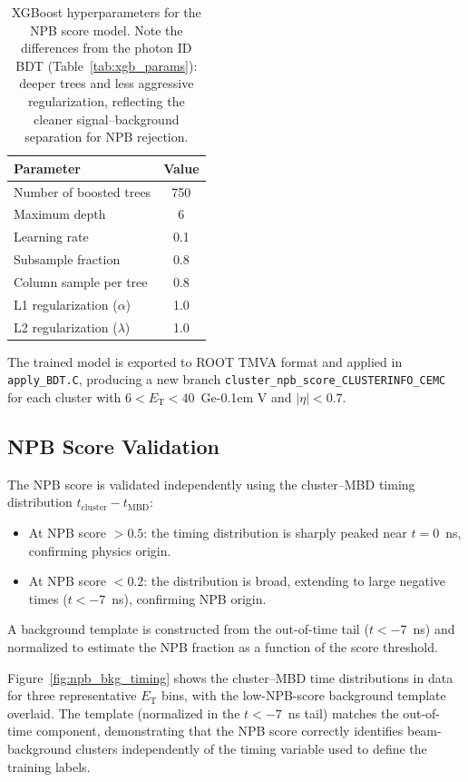 \documentclass[11pt,a4paper]{article}
\newcommand{\ET}{\ensuremath{E_{\text{T}}}\xspace}
\newcommand{\GeV}{\ifmmode {\mathrm{\ Ge\kern -0.1em V}}\else\textrm{Ge\kern -0.1em V}\fi\xspace}
\begin{document}
\begin{table}[H]
    \centering
    \caption{XGBoost hyperparameters for the NPB score model. Note the differences
      from the photon ID BDT (Table~\ref{tab:xgb_params}): deeper trees and less
      aggressive regularization, reflecting the cleaner signal--background separation
      for NPB rejection.}
    \label{tab:npb_params}
    \begin{tabular}{lc}
        \toprule
        Parameter & Value \\
        \midrule
        Number of boosted trees & 750 \\
        Maximum depth & 6 \\
        Learning rate & 0.1 \\
        Subsample fraction & 0.8 \\
        Column sample per tree & 0.8 \\
        L1 regularization ($\alpha$) & 1.0 \\
        L2 regularization ($\lambda$) & 1.0 \\
        \bottomrule
    \end{tabular}
\end{table}

The trained model is exported to ROOT TMVA format and applied in
\texttt{apply\_BDT.C}, producing a new branch
\texttt{cluster\_npb\_score\_CLUSTERINFO\_CEMC} for each cluster with
$6 < \ET < 40$~\GeV and $|\eta| < 0.7$.

\subsection{NPB Score Validation}
\label{subsec:npb_validation}

The NPB score is validated independently using the cluster--MBD timing
distribution $t_{\text{cluster}} - t_{\text{MBD}}$:
\begin{itemize}
    \item At NPB score $> 0.5$: the timing distribution is sharply peaked near
      $t = 0$~ns, confirming physics origin.
    \item At NPB score $< 0.2$: the distribution is broad, extending to large
      negative times ($t < -7$~ns), confirming NPB origin.
\end{itemize}
A background template is constructed from the out-of-time tail ($t < -7$~ns) and
normalized to estimate the NPB fraction as a function of the score threshold.

Figure~\ref{fig:npb_bkg_timing} shows the cluster--MBD time distributions in
data for three representative \ET bins, with the low-NPB-score background
template overlaid.
The template (normalized in the $t < -7$~ns tail) matches the out-of-time
component, demonstrating that the NPB score correctly identifies beam-background
clusters independently of the timing variable used to define the training labels.
\end{document}
